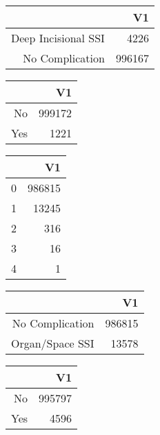 \bigskip\bigskip
\centering
\begin{tabular}{rr}
  \hline
 & V1 \\ 
  \hline
Deep Incisional SSI & 4226 \\ 
  No Complication & 996167 \\ 
   \hline
\end{tabular}

\bigskip\bigskip
\centering
\begin{tabular}{rr}
  \hline
 & V1 \\ 
  \hline
No & 999172 \\ 
  Yes & 1221 \\ 
   \hline
\end{tabular}

\bigskip\bigskip
\centering
\begin{tabular}{rr}
  \hline
 & V1 \\ 
  \hline
0 & 986815 \\ 
  1 & 13245 \\ 
  2 & 316 \\ 
  3 &  16 \\ 
  4 &   1 \\ 
   \hline
\end{tabular}

\bigskip\bigskip
\centering
\begin{tabular}{rr}
  \hline
 & V1 \\ 
  \hline
No Complication & 986815 \\ 
  Organ/Space SSI & 13578 \\ 
   \hline
\end{tabular}

\bigskip\bigskip
\centering
\begin{tabular}{rr}
  \hline
 & V1 \\ 
  \hline
No & 995797 \\ 
  Yes & 4596 \\ 
   \hline
\end{tabular}

